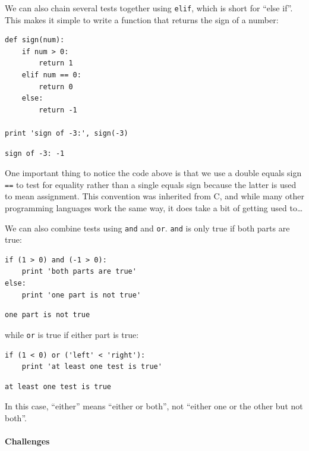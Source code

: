 \documentclass[]{book}
\begin{document}
We can also chain several tests together using \texttt{elif}, which is
short for ``else if''. This makes it simple to write a function that
returns the sign of a number:

\begin{verbatim}
def sign(num):
    if num > 0:
        return 1
    elif num == 0:
        return 0
    else:
        return -1

print 'sign of -3:', sign(-3)
\end{verbatim}

\begin{verbatim}
sign of -3: -1
\end{verbatim}

One important thing to notice the code above is that we use a double
equals sign \texttt{==} to test for equality rather than a single equals
sign because the latter is used to mean assignment. This convention was
inherited from C, and while many other programming languages work the
same way, it does take a bit of getting used to\ldots{}

We can also combine tests using \texttt{and} and \texttt{or}.
\texttt{and} is only true if both parts are true:

\begin{verbatim}
if (1 > 0) and (-1 > 0):
    print 'both parts are true'
else:
    print 'one part is not true'
\end{verbatim}

\begin{verbatim}
one part is not true
\end{verbatim}

while \texttt{or} is true if either part is true:

\begin{verbatim}
if (1 < 0) or ('left' < 'right'):
    print 'at least one test is true'
\end{verbatim}

\begin{verbatim}
at least one test is true
\end{verbatim}

In this case, ``either'' means ``either or both'', not ``either one or
the other but not both''.

\mbox{}\paragraph{Challenges}
\end{document}
